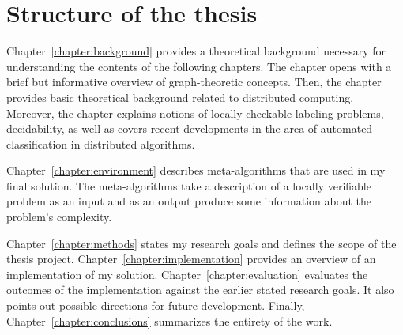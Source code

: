 \section{Structure of the thesis}
\label{section:structure} 

Chapter~\ref{chapter:background} provides a theoretical
background necessary for understanding the contents of the
following chapters. The chapter opens with
a brief but informative overview of graph-theoretic
concepts. Then, the chapter provides basic
theoretical background related to distributed computing.
Moreover, the chapter explains notions of
locally checkable labeling problems, decidability, as well as
covers recent developments in the area of
automated classification in distributed algorithms.

Chapter~\ref{chapter:environment} describes
meta-algorithms that are used in my final
solution. The meta-algorithms take a description
of a locally verifiable problem as an input and
as an output produce some information about the
problem's complexity.

Chapter~\ref{chapter:methods} states my research goals
and defines the scope of the thesis project.
Chapter~\ref{chapter:implementation}
provides an overview of an implementation of
my solution. Chapter~\ref{chapter:evaluation}
evaluates the outcomes of the implementation
against the earlier stated research goals. It
also points out possible directions for
future development. Finally, Chapter~\ref{chapter:conclusions}
summarizes the entirety of the work.
